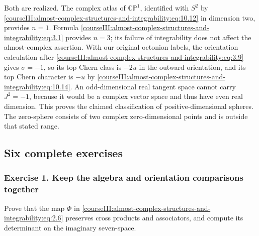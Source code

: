 Both are realized. The complex atlas of \(\mathbb{CP}^1\), identified with \(S^2\) by \eqref{courseIII:almost-complex-structures-and-integrability:eq:10.12} in dimension two, provides \(n=1\). Formula \eqref{courseIII:almost-complex-structures-and-integrability:eq:3.1} provides \(n=3\); its failure of integrability does not affect the almost-complex assertion. With our original octonion labels, the orientation calculation after \eqref{courseIII:almost-complex-structures-and-integrability:eq:3.9} gives \(\sigma=-1\), so its top Chern class is \(-2u\) in the outward orientation, and its top Chern character is \(-u\) by \eqref{courseIII:almost-complex-structures-and-integrability:eq:10.14}. An odd-dimensional real tangent space cannot carry \(J^2=-1\), because it would be a complex vector space and thus have even real dimension. This proves the claimed classification of positive-dimensional spheres. The zero-sphere consists of two complex zero-dimensional points and is outside that stated range.

\subsection{Six complete exercises}
\label{courseIII:almost-complex-structures-and-integrability:integrability-exercises}

\label{courseIII:almost-complex-structures-and-integrability:section-11}

\subsubsection{Exercise 1. Keep the algebra and orientation comparisons together}
\label{courseIII:almost-complex-structures-and-integrability:exercise-1}

Prove that the map \(\Phi\) in \eqref{courseIII:almost-complex-structures-and-integrability:eq:2.6} preserves cross products and associators, and compute its determinant on the imaginary seven-space.

